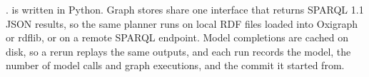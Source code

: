 .
\hermes is written in Python.
Graph stores share one interface that returns SPARQL 1.1 JSON results,
so the same planner runs on local RDF files loaded into
Oxigraph~\cite{oxigraph} or rdflib, or on a remote SPARQL endpoint.
Model completions are cached on disk, so a rerun replays the same
outputs, and each run records the model, the number of model calls and
graph executions, and the commit it started from.
